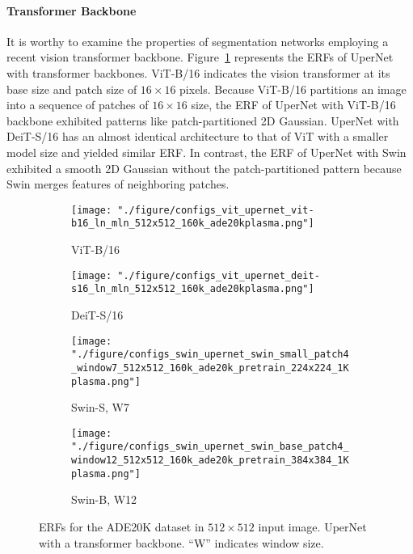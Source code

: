 \documentclass{article}
\def\figref#1{Figure~\ref{#1}}
\begin{document}
\paragraph{Transformer Backbone} It is worthy to examine the properties of segmentation networks employing a recent vision transformer backbone. \figref{fig:trback} represents the ERFs of UperNet \citep{DBLP:conf/eccv/XiaoLZJS18} with transformer backbones. ViT-B/16 indicates the vision transformer at its base size and patch size of $16 \times 16$ pixels. Because ViT-B/16 \citep{DBLP:conf/iclr/DosovitskiyB0WZ21} partitions an image into a sequence of patches of $16 \times 16$ size, the ERF of UperNet with ViT-B/16 backbone exhibited patterns like patch-partitioned 2D Gaussian. UperNet with DeiT-S/16 \citep{DBLP:conf/icml/TouvronCDMSJ21} has an almost identical architecture to that of ViT with a smaller model size and yielded similar ERF. In contrast, the ERF of UperNet with Swin \citep{DBLP:conf/iccv/LiuL00W0LG21} exhibited a smooth 2D Gaussian without the patch-partitioned pattern because Swin merges features of neighboring patches.

\begin{figure}[t!]
	\centering
	\begin{subfigure}[b]{0.241\linewidth}
		\centering
		\texttt{[image: "./figure/configs\_vit\_upernet\_vit-b16\_ln\_mln\_512x512\_160k\_ade20kplasma.png"]}
		\caption{ViT-B/16 \citep{DBLP:conf/iclr/DosovitskiyB0WZ21}}
	\end{subfigure}
	\hfill
	\begin{subfigure}[b]{0.241\linewidth}
		\centering
		\texttt{[image: "./figure/configs\_vit\_upernet\_deit-s16\_ln\_mln\_512x512\_160k\_ade20kplasma.png"]}
		\caption{DeiT-S/16 \citep{DBLP:conf/icml/TouvronCDMSJ21}}
	\end{subfigure}
	\hfill
	\begin{subfigure}[b]{0.241\linewidth}
		\centering
		\texttt{[image: "./figure/configs\_swin\_upernet\_swin\_small\_patch4\_window7\_512x512\_160k\_ade20k\_pretrain\_224x224\_1Kplasma.png"]}
		\caption{Swin-S, W7 \citep{DBLP:conf/iccv/LiuL00W0LG21}}
	\end{subfigure}
	\hfill
	\begin{subfigure}[b]{0.241\linewidth}
		\centering
		\texttt{[image: "./figure/configs\_swin\_upernet\_swin\_base\_patch4\_window12\_512x512\_160k\_ade20k\_pretrain\_384x384\_1Kplasma.png"]}
		\caption{Swin-B, W12 \citep{DBLP:conf/iccv/LiuL00W0LG21}}
	\end{subfigure}
	\caption{ERFs for the ADE20K dataset in $512 \times 512$ input image. UperNet with a transformer backbone. ``W'' indicates window size.}
	\label{fig:trback}
\end{figure}
\end{document}
